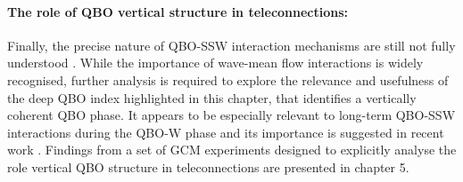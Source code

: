 \paragraph{The role of QBO vertical structure in teleconnections:} Finally, the precise nature of QBO-SSW interaction mechanisms are still not fully understood \citep{ansteyHighlatitude2014}. While the importance of wave-mean flow interactions is widely recognised, further analysis is required to explore the relevance and usefulness of the deep QBO index highlighted in this chapter, that identifies a vertically coherent QBO phase. It appears to be especially relevant to long-term QBO-SSW interactions during the QBO-W phase and its importance is suggested in recent work \citep{andrewsObserved2019}. Findings from a set of GCM experiments designed to explicitly analyse the role vertical QBO structure in teleconnections are presented in chapter 5. 
